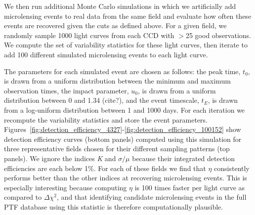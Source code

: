 \documentclass[iop]{emulateapj}
\newcommand{\apwsim}{\raisebox{0.2ex}{\scriptsize$\sim$\normalsize}}
\begin{document}
We then run additional Monte Carlo simulations in which we artificially add microlensing events to real data from the same field and evaluate how often these events are recovered given the cuts as defined above. For a given field, we randomly sample 1000 light curves from each CCD with $>$25 good observations. We compute the set of variability statistics for these light curves, then iterate to add 100 different simulated microlensing events to each light curve. 

The parameters for each simulated event are chosen as follows: the peak time, $t_0$, is drawn from a uniform distribution between the minimum and maximum observation times, the impact parameter, $u_0$, is drawn from a uniform distribution between 0 and 1.34 (cite?), and the event timescale, $t_E$, is drawn from a log-uniform distribution between 1 and 1000 days. For each iteration we recompute the variability statistics and store the event parameters. Figures~\ref{fig:detection_efficiency_4327}-\ref{fig:detection_efficiency_100152} show detection efficiency curves (bottom panels) computed using this simulation for three representative fields chosen for their different sampling patterns (top panels). We ignore the indices \textit{K} and $\sigma/\mu$ because their integrated detection efficiencies are each below 1\%. For each of these fields we find that $\eta$ consistently performs better than the other indices at recovering microlensing events. This is especially interesting because computing $\eta$ is \apwsim100 times faster per light curve as compared to $\Delta\chi^2$, and that identifying candidate microlensing events in the full PTF database using this statistic is therefore computationally plausible.


\end{document}
